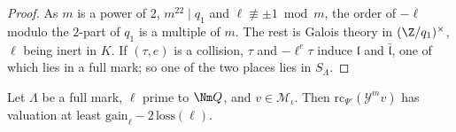 \begin{proof}
As $m$ is a power of $2$, $m^{22}\mid q_1$ and $\ell\not\equiv\pm1\bmod m$, the order of $-\ell$ modulo
the $2$-part of $q_1$ is a multiple of $m$. The rest is Galois theory in $(\Z/q_1)^\times$, $\ell$
being inert in $K$. If $(\tau,e)$ is a collision, $\tau$ and $-\ell^e\tau$ induce $\mathfrak l$ and
$\bar{\mathfrak l}$, one of which lies in a full mark; so one of the two places lies in $S_\Lambda$.
\end{proof}

\begin{proposition}
\label{ub-divis:prop:Yval}
Let $\Lambda$ be a full mark, $\ell$ prime to $\Nm Q$, and $v\in\mathcal M_\iota$.
Then $\mathrm{rc}_{\Psi'}(\mathcal Y^mv)$ has valuation at least $\mathrm{gain}_\ell-2\,\mathrm{loss}(\ell)$.
\end{proposition}

